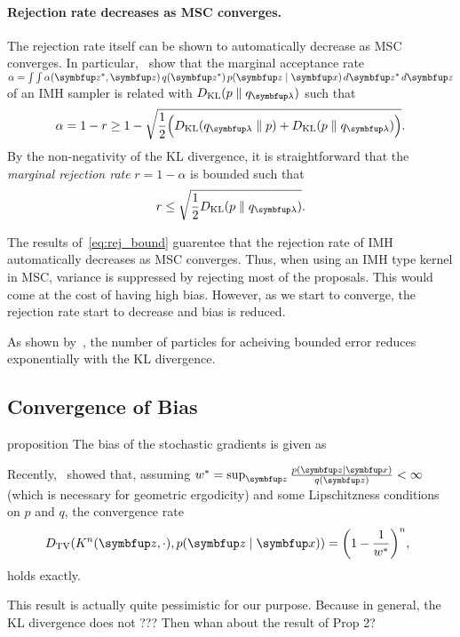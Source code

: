 \paragraph{Rejection rate decreases as MSC converges.}
The rejection rate itself can be shown to automatically decrease as MSC converges.
In particular,~\citet[Theorem 1]{neklyudov_metropolishastings_2019} show that the marginal acceptance rate \(\alpha = \int \int \alpha(\vz^*,\vz)\,q(\vz^*)\,p(\vz\mid\vx)\,d\vz^*\,d\vz \) of an IMH sampler is related with \(\DKL{p}{q_{\vlambda}}\) such that
\begin{align}
    \alpha = 1 - r \geq 1 - \sqrt{
      \frac{1}{2} \Big(
      \DKL{q_{\vlambda}}{p} + \DKL{p}{q_{\vlambda}}
      \Big)
    }.
\end{align}
By the non-negativity of the KL divergence, it is straightforward that the \textit{marginal rejection rate} \(r=1 - \alpha\) is bounded such that
\begin{align}
  r
  \leq 
  \sqrt{ \frac{1}{2}
    \DKL{p}{q_{\vlambda}}
  }.\label{eq:rej_bound}
\end{align}

The results of~\eqref{eq:rej_bound} guarentee that the rejection rate of IMH automatically decreases as MSC converges.
Thus, when using an IMH type kernel in MSC, variance is suppressed by rejecting most of the proposals.
This would come at the cost of having high bias.
However, as we start to converge, the rejection rate start to decrease and bias is reduced.

As shown by~\citet{10.1214/17-STS611, chatterjee_sample_2018}, the number of particles for acheiving bounded error reduces exponentially with the KL divergence.


\subsection{Convergence of Bias}
\begin{theoremEnd}{proposition}
  The bias of the stochastic gradients is given as
\end{theoremEnd}
Recently,~\citet[Theorem 3]{wang_exact_2020} showed that, assuming \(w^* = \sup_{\vz}{ \frac{p(\vz\mid\vx)}{q(\vz)} } < \infty \) (which is necessary for geometric ergodicity) and some Lipschitzness conditions on \(p\) and \(q\), the convergence rate 
\begin{align}
  \DTV{K^{n}(\vz, \cdot)}{p(\vz\mid\vx)} = {\left( 1 - \frac{1}{w^*} \right)}^{n},
  \;\; 
\end{align}
holds exactly.

This result is actually quite pessimistic for our purpose.
Because in general, the KL divergence does not 
??? Then whan about the result of Prop 2?


